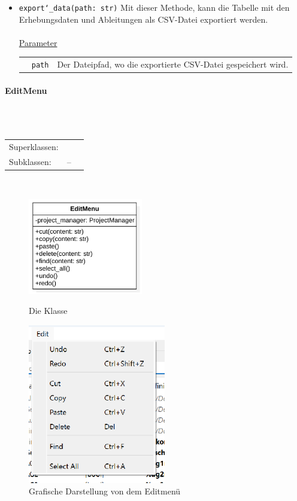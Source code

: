 \documentclass{article}
\newcommand{\classheader}[2][]{\paragraph{#2}
\mbox{}\textit{#1}\\\\}
\newcommand{\classref}[1]{\texttt{\nameref{cls:#1}}}
\begin{document}
\begin{itemize}
\item \texttt{export\char`_data(path: str)} \newline Mit dieser Methode, kann die Tabelle mit den Erhebungsdaten und Ableitungen als CSV-Datei exportiert werden.
\\\\
\underline{{Parameter}}\\
\begin{tabular}{lll}
 & \texttt{path} & Der Dateipfad, wo die exportierte CSV-Datei gespeichert wird. \\
\end{tabular}
\end{itemize}

\newpage
\classheader[]{EditMenu}\label{cls:EditMenu}
\begin{tabular}{lll}
 Superklassen: & \classref{Menu}\\
 Subklassen: & --\\
\end{tabular}\\
\begin{figure}[H]%
    \centering
    \begin{minipage}[b]{0.4\textwidth}
        \includegraphics[width=5cm]{entwurf/Entwurf_dokument/img/klassenView/EditMenu.png}
        \caption{Die Klasse \classref{EditMenu}}
    \end{minipage}
    \hfill
    \begin{minipage}[b]{0.4\textwidth}
        \includegraphics[width=6cm]{entwurf/Entwurf_dokument/img/Alissa/FileMenuGUI.png} %
        \caption{Grafische Darstellung von dem Editmenü}
        \label{fig:EditMenuGUI}
    \end{minipage}
\end{figure}
\end{document}
